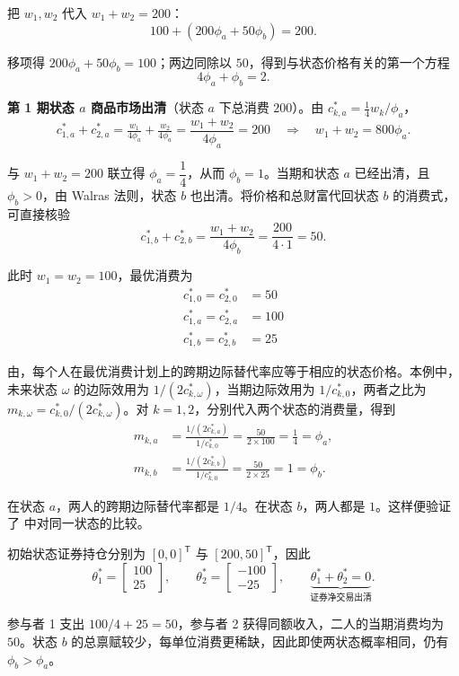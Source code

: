 \begin{tcolorbox}[example]
\begin{solution}[blank-type=manual,blank-vsep=5\baselineskip]
把 $w_{1},w_{2}$ 代入 $w_{1}+w_{2}=200$：
\[
    100+(200\phi_{a}+50\phi_{b})=200.
\]

移项得 $200\phi_{a}+50\phi_{b}=100$；两边同除以 $50$，得到与状态价格有关的第一个方程
\[
    4\phi_{a}+\phi_{b}=2.
\]

\textbf{第 1 期状态 $a$ 商品市场出清}（状态 $a$ 下总消费 $200$）。由 $c_{k,a}^{*}=\tfrac14 w_{k}/\phi_{a}$，
\[
    c_{1,a}^{*}+c_{2,a}^{*}=\tfrac{w_{1}}{4\phi_{a}}+\tfrac{w_{2}}{4\phi_{a}}
    =\frac{w_{1}+w_{2}}{4\phi_{a}}=200
    \quad\Longrightarrow\quad w_{1}+w_{2}=800\phi_{a}.
\]

与 $w_{1}+w_{2}=200$ 联立得 $\phi_{a}=\dfrac14$，从而 $\phi_{b}=1$。当期和状态 $a$ 已经出清，且 $\phi_b>0$，由 Walras 法则，状态 $b$ 也出清。将价格和总财富代回状态 $b$ 的消费式，可直接核验
\[
 c_{1,b}^{*}+c_{2,b}^{*}
 =\frac{w_1+w_2}{4\phi_b}=\frac{200}{4\cdot 1}=50.
\]

此时 $w_{1}=w_{2}=100$，最优消费为
\[
    \begin{aligned}
        c_{1,0}^{*}=c_{2,0}^{*}&=50\\
        c_{1,a}^{*}=c_{2,a}^{*}&=100\\
        c_{1,b}^{*}=c_{2,b}^{*}&=25
    \end{aligned}
\]

由，每个人在最优消费计划上的跨期边际替代率应等于相应的状态价格。本例中，未来状态 $\omega$ 的边际效用为 $1/(2c_{k,\omega}^*)$，当期边际效用为 $1/c_{k,0}^*$，两者之比为 $m_{k,\omega}=c_{k,0}^*/(2c_{k,\omega}^*)$。对 $k=1,2$，分别代入两个状态的消费量，得到
\[
 \begin{aligned}
 m_{k,a}&=\frac{1/(2c_{k,a}^*)}{1/c_{k,0}^*}
 =\frac{50}{2\times100}=\frac14=\phi_a,\\
 m_{k,b}&=\frac{1/(2c_{k,b}^*)}{1/c_{k,0}^*}
 =\frac{50}{2\times25}=1=\phi_b.
 \end{aligned}
\]

在状态 $a$，两人的跨期边际替代率都是 $1/4$。在状态 $b$，两人都是 $1$。这样便验证了 中对同一状态的比较。

初始状态证券持仓分别为 $[0,0]^{\mathsf T}$ 与 $[200,50]^{\mathsf T}$，因此
\[
 \theta_1^*=\begin{bmatrix}100\\25\end{bmatrix},\qquad
 \theta_2^*=\begin{bmatrix}-100\\-25\end{bmatrix},\qquad
 \underbrace{\theta_1^*+\theta_2^*=0}_{\text{证券净交易出清}}.
\]

参与者 1 支出 $100/4+25=50$，参与者 2 获得同额收入，二人的当期消费均为 $50$。状态 $b$ 的总禀赋较少，每单位消费更稀缺，因此即使两状态概率相同，仍有 $\phi_b>\phi_a$。

\end{solution}
\end{tcolorbox}


